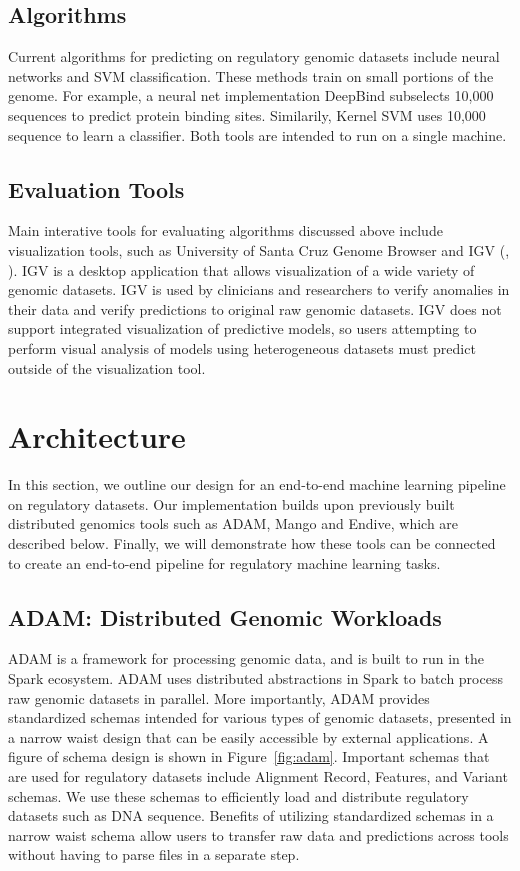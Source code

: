 \documentclass{sig-alternate-05-2015}
\begin{document}
\subsection{Algorithms}
Current algorithms for predicting on regulatory genomic datasets include neural networks and SVM classification. These methods train on small portions of the genome. For example, a neural net implementation DeepBind subselects 10,000 sequences to predict protein binding sites. Similarily, Kernel SVM uses 10,000 sequence to learn a classifier. Both tools are intended to run on a single machine. \\

\subsection{Evaluation Tools}
Main interative tools for evaluating algorithms discussed above include visualization tools, such as University of Santa Cruz Genome Browser and IGV (\cite{ucscbrowser}, \cite{igv2011}). IGV is a desktop application that allows visualization of a wide variety of genomic datasets. IGV is used by clinicians and researchers to verify anomalies in their data and verify predictions to original raw genomic datasets. IGV does not support integrated visualization of predictive models, so users attempting to perform visual analysis of models using heterogeneous datasets must predict outside of the visualization tool.

\section{Architecture}
In this section, we outline our design for an end-to-end machine learning pipeline on regulatory datasets. Our implementation builds upon previously built distributed genomics tools such as ADAM, Mango and Endive, which are described below. Finally, we will demonstrate how these tools can be connected to create an end-to-end pipeline for regulatory machine learning tasks. \\

\subsection{ADAM: Distributed Genomic Workloads}
ADAM is a framework for processing genomic data, and is built to run in the Spark ecosystem. ADAM uses distributed abstractions in Spark to batch process raw genomic datasets in parallel. More importantly, ADAM provides standardized schemas intended for various types of genomic datasets, presented in a narrow waist design that can be easily accessible by external applications. A figure of schema design is shown in Figure~\ref{fig:adam}. Important schemas that are used for regulatory datasets include Alignment Record, Features, and Variant schemas. We use these schemas to efficiently load and distribute regulatory datasets such as DNA sequence. Benefits of utilizing standardized schemas in a narrow waist schema allow users to transfer raw data and predictions across tools without having to parse files in a separate step.
\end{document}
